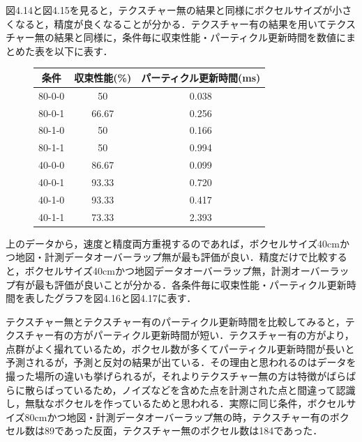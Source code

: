図4.14と図4.15を見ると，テクスチャー無の結果と同様にボクセルサイズが小さくなると，精度が良くなることが分かる．テクスチャー有の結果を用いてテクスチャー無の結果と同様に，条件毎に収束性能・パーティクル更新時間を数値にまとめた表を以下に表す．

%
\begin{figure}[htbp]
\begin{center}
\begin{tabular}{ccc} \hline
条件 & 収束性能(\%) &  パーティクル更新時間(ms)\\ \hline \hline
80-0-0 & 50 & 0.038\\ \hline
80-0-1 & 66.67 & 0.256\\ \hline
80-1-0 & 50 & 0.166\\ \hline
80-1-1 & 50 & 0.994\\ \hline
40-0-0 & 86.67 & 0.099\\ \hline
40-0-1 & 93.33 & 0.720\\ \hline
40-1-0 & 93.33 & 0.417\\ \hline
40-1-1 & 73.33 & 2.393\\ \hline
\end{tabular}
\end{center}
\end{figure}
%

上のデータから，速度と精度両方重視するのであれば，ボクセルサイズ40cmかつ地図・計測データオーバーラップ無が最も評価が良い．精度だけで比較すると，ボクセルサイズ40cmかつ地図データオーバーラップ無，計測オーバーラップ有が最も評価が良いことが分かる．各条件毎に収束性能・パーティクル更新時間を表したグラフを図4.16と図4.17に表す．\par
テクスチャー無とテクスチャー有のパーティクル更新時間を比較してみると，テクスチャー有の方がパーティクル更新時間が短い．テクスチャー有の方がより，点群がよく撮れているため，ボクセル数が多くてパーティクル更新時間が長いと予測されるが，予測と反対の結果が出ている．その理由と思われるのはデータを撮った場所の違いも挙げられるが，それよりテクスチャー無の方は特徴がばらばらに散らばっているため，ノイズなどを含めた点を計測された点と間違って認識し，無駄なボクセルを作っているためと思われる．実際に同じ条件，ボクセルサイズ80cmかつ地図・計測データオーバーラップ無の時，テクスチャー有のボクセル数は89であった反面，テクスチャー無のボクセル数は184であった．

